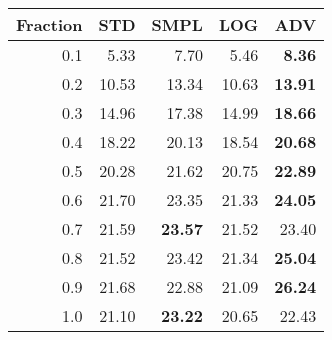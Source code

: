 \documentclass{standalone}
\begin{document}
\begin{tabular}{r|rrrr}
      \toprule
      Fraction & STD & SMPL & LOG & ADV\\
      \midrule
      0.1 & 5.33 & 7.70 & 5.46 & \textbf{8.36}\\
  0.2 & 10.53 & 13.34 & 10.63 & \textbf{13.91}\\
  0.3 & 14.96 & 17.38 & 14.99 & \textbf{18.66}\\
  0.4 & 18.22 & 20.13 & 18.54 & \textbf{20.68}\\
  0.5 & 20.28 & 21.62 & 20.75 & \textbf{22.89}\\
  0.6 & 21.70 & 23.35 & 21.33 & \textbf{24.05}\\
  0.7 & 21.59 & \textbf{23.57} & 21.52 & 23.40\\
  0.8 & 21.52 & 23.42 & 21.34 & \textbf{25.04}\\
  0.9 & 21.68 & 22.88 & 21.09 & \textbf{26.24}\\
  1.0 & 21.10 & \textbf{23.22} & 20.65 & 22.43\\
  \bottomrule
\end{tabular}
\end{document}
